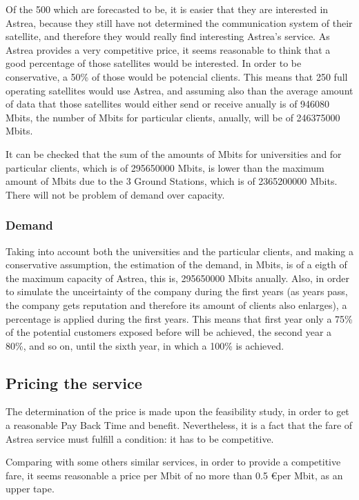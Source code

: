Of the 500 which are forecasted to be, it is easier that they are interested in Astrea, because they still have not determined the communication system of their satellite, and therefore they would really find interesting Astrea's service. As Astrea provides a very competitive price, it seems reasonable to think that a good percentage of those satellites would be interested. In order to be conservative, a 50\% of those would be potencial clients. This means that 250 full operating satellites would use Astrea, and assuming also than the average amount of data that those satellites would either send or receive anually is of 946080 Mbits, the number of Mbits for particular clients, anually, will be of 246375000 Mbits.

It can be checked that the sum of the amounts of Mbits for universities and for particular clients, which is of 295650000
Mbits, is lower than the maximum amount of Mbits due to the 3 Ground Stations, which is of 2365200000 Mbits. There will not be problem of demand over capacity. 

\subsubsection{Demand}
Taking into account both the universities and the particular clients, and making a conservative assumption, the estimation of the demand, in Mbits, is of a eigth of the maximum capacity of Astrea, this is, 295650000 Mbits anually. Also, in order to simulate the unceirtainty of the company during the first years (as years pass, the company gets reputation and therefore its amount of clients also enlarges), a percentage is applied during the first years. This means that first year only a 75\% of the potential customers exposed before will be achieved, the second year a 80\%, and so on, until the sixth year, in which a 100\% is achieved. 

\subsection{Pricing the service}
The determination of the price is made upon the feasibility study, in order to get a reasonable Pay Back Time and benefit. Nevertheless, it is a fact that the fare of Astrea service must fulfill a condition: it has to be competitive. 

Comparing with some others similar services, in order to provide a competitive fare, it seems reasonable a price per Mbit of no more than 0.5 \euro per Mbit, as an upper tape.  


